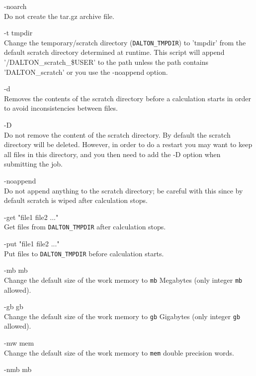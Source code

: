 \begin{list}{--}{}
\item[-noarch \hfill] \hfill \\
  Do not create the tar.gz archive file.
\item[-t tmpdir \hfill] \hfill \\
  Change the temporary/scratch directory (\verb|DALTON_TMPDIR|) to 'tmpdir' from the default scratch directory
  determined at runtime. This script will append \\
  '/DALTON\_scratch\_\$USER' to the path unless the path contains
  'DALTON\_scratch' or you use the -noappend option.
\item[-d \hfill] \hfill \\
  Removes the contents of the scratch directory before a
  calculation starts in order to avoid inconsistencies between files.
\item[-D \hfill] \hfill \\
  Do not remove the content of the scratch directory. By
  default the scratch directory will be deleted. However, in order to do
  a restart you may want to keep all files in this directory, and you
  then need to add the -D option when submitting the job.
\item[-noappend \hfill] \hfill \\
  Do not append anything to the scratch directory; be careful with
  this since by default scratch is wiped after calculation stops.
\item[-get "file1 file2 ..." \hfill] \hfill \\
  Get files from \verb|DALTON_TMPDIR| after calculation stops.
\item[-put "file1 file2 ..." \hfill] \hfill \\
  Put files to \verb|DALTON_TMPDIR| before calculation starts.
\item[-mb mb \hfill] \hfill \\
  Change the default size of the work memory
   to \verb|mb| Megabytes (only integer \verb|mb| allowed).
\item[-gb gb \hfill] \hfill \\
  Change the default size of the work memory
   to \verb|gb| Gigabytes (only integer \verb|gb| allowed).
\item[-mw mem \hfill] \hfill \\
  Change the default size of the work memory
   to \verb|mem| double precision words.
\item[-nmb mb \hfill] \hfill \\

\end{list}
